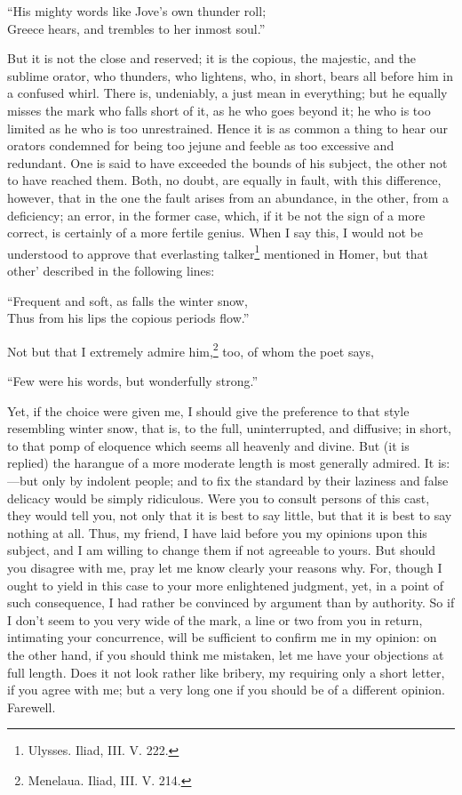 ``His mighty words like Jove's own thunder roll;\\
Greece hears, and trembles to her inmost soul.''

But it is not the close and reserved; it is the copious, the majestic, and
the sublime orator, who thunders, who lightens, who, in short, bears all
before him in a confused whirl. There is, undeniably, a just mean in
everything; but he equally misses the mark who falls short of it, as he
who goes beyond it; he who is too limited as he who is too unrestrained.
Hence it is as common a thing to hear our orators condemned for being too
jejune and feeble as too excessive and redundant. One is said to have
exceeded the bounds of his subject, the other not to have reached them.
Both, no doubt, are equally in fault, with this difference, however, that
in the one the fault arises from an abundance, in the other, from a
deficiency; an error, in the former case, which, if it be not the sign of
a more correct, is certainly of a more fertile genius. When I say this, I
would not be understood to approve that everlasting talker\footnote{Ulysses. Iliad, III. V.
222.}
mentioned in Homer, but that other' described in the following lines:

``Frequent and soft, as falls the winter snow,\\
Thus from his lips the copious periods flow.''

Not but that I extremely admire him,\footnote{Menelaua. Iliad, III. V.
214.} too, of whom the poet
says,

``Few were his words, but wonderfully strong.''

Yet, if the choice were given me, I should give the preference to that
style resembling winter snow, that is, to the full, uninterrupted, and
diffusive; in short, to that pomp of eloquence which seems all heavenly
and divine. But (it is replied) the harangue of a more moderate length is
most generally admired. It is:—but only by indolent people; and to
fix the standard by their laziness and false delicacy would be simply
ridiculous. Were you to consult persons of this cast, they would tell you,
not only that it is best to say little, but that it is best to say nothing
at all. Thus, my friend, I have laid before you my opinions upon this
subject, and I am willing to change them if not agreeable to yours. But
should you disagree with me, pray let me know clearly your reasons why.
For, though I ought to yield in this case to your more enlightened
judgment, yet, in a point of such consequence, I had rather be convinced
by argument than by authority. So if I don't seem to you very wide of the
mark, a line or two from you in return, intimating your concurrence, will
be sufficient to confirm me in my opinion: on the other hand, if you
should think me mistaken, let me have your objections at full length. Does
it not look rather like bribery, my requiring only a short letter, if you
agree with me; but a very long one if you should be of a different
opinion. Farewell.

